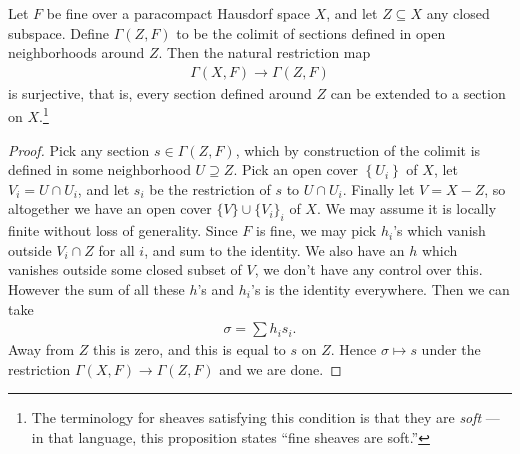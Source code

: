\documentclass[11pt]{book}
\begin{document}
\begin{proposition} Let $F$ be fine over a paracompact Hausdorf space $X$, and let $Z \subseteq X$ any closed subspace. Define $\Gamma(Z,F)$ to be the colimit of sections defined in open neighborhoods around $Z$. Then the natural restriction map
\begin{align*}
    \Gamma(X,F) \to \Gamma(Z,F)
\end{align*}
is surjective, that is, every section defined around $Z$ can be extended to a section on $X$.\footnote{The terminology for sheaves satisfying this condition is that they are \emph{soft} --- in that language, this proposition states ``fine sheaves are soft.''}
\end{proposition}
\begin{proof}
Pick any section $s\in \Gamma(Z,F)$, which by construction of the colimit is defined in some neighborhood $U \supseteq Z$. Pick an open cover $\left\{ U_i \right\}$ of $X$, let $V_i = U \cap U_i$, and let $s_i$ be the restriction of $s$ to $U \cap U_i$. Finally let $V = X - Z$, so altogether we have an open cover $\{V\} \cup \{V_i\}_i$ of $X$. We may assume it is locally finite without loss of generality. Since $F$ is fine, we may pick $h_i$'s which vanish outside $V_i \cap Z$ for all $i$, and sum to the identity. We also have an $h$ which vanishes outside some closed subset of $V$, we don't have any control over this. However the sum of all these $h$'s and $h_i$'s is the identity everywhere. Then we can take
\begin{align*}
    \sigma = \sum h_i s_i.
\end{align*}
Away from $Z$ this is zero, and this is equal to $s$ on $Z$. Hence $\sigma \mapsto s$ under the restriction $\Gamma(X,F) \to \Gamma(Z,F)$ and we are done.
\end{proof}
\end{document}
